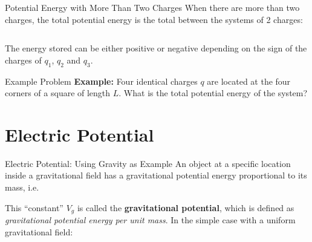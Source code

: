 \documentclass[12pt,aspectratio=169]{beamer}
\begin{document}
\begin{frame}{Potential Energy with More Than Two Charges}
  When there are more than two charges, the total potential energy is the
  total between the systems of 2 charges:

  \vspace{.1in}
  \begin{columns}

  \end{columns}
  
  \vspace{.2in}The energy stored can be either positive or negative depending
  on the sign of the charges of $q_1$, $q_2$ and $q_3$.
\end{frame}



\begin{frame}{Example Problem}
  \textbf{Example:} Four identical charges $q$ are located at the four corners
  of a square of length $L$. What is the total potential energy of the system?
  \begin{center}
  \end{center}
\end{frame}



\section{Electric Potential}

\begin{frame}{Electric Potential: Using Gravity as Example}
  An object at a specific location inside a gravitational field has a
  gravitational potential energy proportional to its mass, i.e.\

  
  This ``constant'' $V_g$ is called the \textbf{gravitational potential}, which
  is defined as \emph{gravitational potential energy per unit mass}. In the
  simple case with a uniform gravitational field:


\end{frame}
\end{document}
